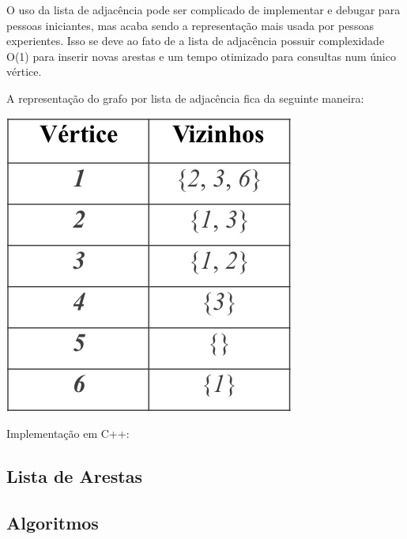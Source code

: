 \documentclass[a4paper,12pt]{article}
\begin{document}
\indent O uso da lista de adjacência pode ser complicado de implementar e debugar para pessoas iniciantes, mas acaba sendo a representação mais usada por pessoas experientes. Isso se deve ao fato de a lista de adjacência possuir complexidade O(1) para inserir novas arestas e um tempo otimizado para consultas num único vértice.

\indent A representação do grafo por lista de adjacência fica da seguinte maneira:

\begin{center}
  \includegraphics[width=\linewidth/2]{figures/grafos/representacao_lista_adj.png}
\end{center}

\noindent Implementação em C++:


\subsection{Lista de Arestas}

\subsection{Algoritmos}
\end{document}
